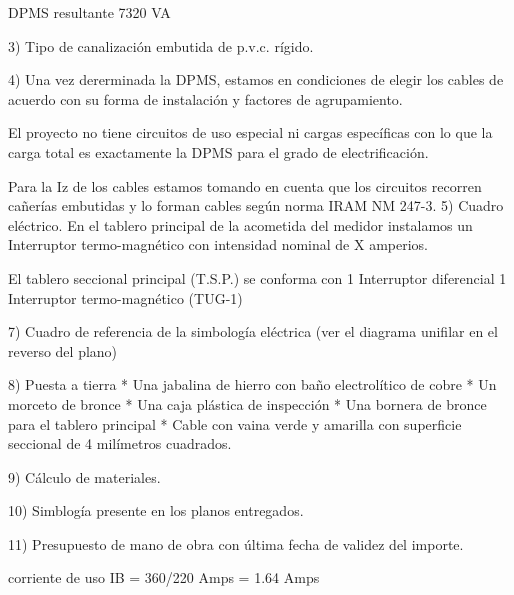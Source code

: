 DPMS resultante                            7320 VA

3) Tipo de canalización embutida de p.v.c. rígido.

4) Una vez dererminada la DPMS, estamos en condiciones de elegir los cables de acuerdo
con su forma de instalación y factores de agrupamiento.

El proyecto no tiene circuitos de uso especial ni cargas específicas con lo que 
la carga total es exactamente la DPMS para el grado de electrificación.

Para la Iz de los cables estamos tomando en cuenta que los circuitos recorren cañerías
embutidas y lo forman cables según norma IRAM NM 247-3.
5) Cuadro eléctrico. 
En el tablero principal de la acometida del medidor instalamos un
Interruptor termo-magnético con intensidad nominal de X amperios.

El tablero seccional principal (T.S.P.) se conforma con
1 Interruptor diferencial
1 Interruptor termo-magnético (TUG-1)

7) Cuadro de referencia de la simbología eléctrica (ver el diagrama unifilar en el reverso del plano)

8) Puesta a tierra
* Una jabalina de hierro con baño electrolítico de cobre
* Un morceto de bronce
* Una caja plástica de inspección
* Una bornera de bronce para el tablero principal
* Cable con vaina verde y amarilla con superficie seccional de 4 milímetros cuadrados.

9) Cálculo de materiales.

10) Simblogía presente en los planos entregados.

11) Presupuesto de mano de obra con última fecha de validez del importe.






corriente de uso IB = 360/220 Amps = 1.64 Amps



